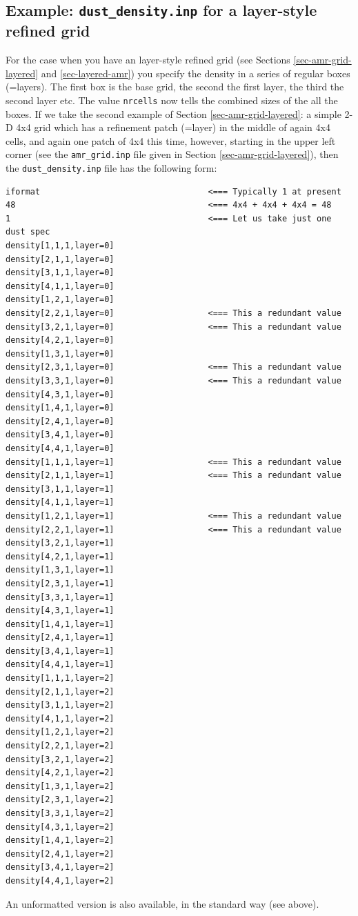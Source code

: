 \documentclass{report}
\newenvironment{asciibox}%
  {\begin{list}{}{%
    \setlength{\topsep}{0.5em}%
    \setlength{\parskip}{0em}%
    \setlength{\parsep}{0em}%
    \setlength{\itemsep}{0em}%
    \setlength{\rightmargin}{0em}%
    \setlength{\leftmargin}{3.0em}%
    \setlength{\labelsep}{1em}%
    \setlength{\labelwidth}{2em}%
  }\normalfont\footnotesize\item}
  {\end{list}}
\begin{document}
\subsection{Example: {\small\tt dust\_density.inp} for a layer-style refined grid}
For the case when you have an layer-style refined grid (see Sections
\ref{sec-amr-grid-layered} and \ref{sec-layered-amr}) you specify the
density in a series of regular boxes (=layers). The first box is the base
grid, the second the first layer, the third the second layer etc.  The value
{\small\tt nrcells} now tells the combined sizes of the all the boxes. If we
take the second example of Section \ref{sec-amr-grid-layered}: a simple 2-D
4x4 grid which has a refinement patch (=layer) in the middle of again 4x4
cells, and again one patch of 4x4 this time, however, starting in the upper
left corner (see the {\small\tt amr\_grid.inp} file given in Section
\ref{sec-amr-grid-layered}), then the {\small\tt dust\_density.inp} file
has the following form:
\begin{asciibox}\begin{verbatim}
iformat                                  <=== Typically 1 at present
48                                       <=== 4x4 + 4x4 + 4x4 = 48
1                                        <=== Let us take just one dust spec
density[1,1,1,layer=0]
density[2,1,1,layer=0]
density[3,1,1,layer=0]
density[4,1,1,layer=0]
density[1,2,1,layer=0]
density[2,2,1,layer=0]                   <=== This a redundant value
density[3,2,1,layer=0]                   <=== This a redundant value
density[4,2,1,layer=0]
density[1,3,1,layer=0]
density[2,3,1,layer=0]                   <=== This a redundant value
density[3,3,1,layer=0]                   <=== This a redundant value
density[4,3,1,layer=0]
density[1,4,1,layer=0]
density[2,4,1,layer=0]
density[3,4,1,layer=0]
density[4,4,1,layer=0]
density[1,1,1,layer=1]                   <=== This a redundant value
density[2,1,1,layer=1]                   <=== This a redundant value
density[3,1,1,layer=1]
density[4,1,1,layer=1]
density[1,2,1,layer=1]                   <=== This a redundant value
density[2,2,1,layer=1]                   <=== This a redundant value
density[3,2,1,layer=1]
density[4,2,1,layer=1]
density[1,3,1,layer=1]
density[2,3,1,layer=1]
density[3,3,1,layer=1]
density[4,3,1,layer=1]
density[1,4,1,layer=1]
density[2,4,1,layer=1]
density[3,4,1,layer=1]
density[4,4,1,layer=1]
density[1,1,1,layer=2]
density[2,1,1,layer=2]
density[3,1,1,layer=2]
density[4,1,1,layer=2]
density[1,2,1,layer=2]
density[2,2,1,layer=2]
density[3,2,1,layer=2]
density[4,2,1,layer=2]
density[1,3,1,layer=2]
density[2,3,1,layer=2]
density[3,3,1,layer=2]
density[4,3,1,layer=2]
density[1,4,1,layer=2]
density[2,4,1,layer=2]
density[3,4,1,layer=2]
density[4,4,1,layer=2]
\end{verbatim}\end{asciibox}
An unformatted version is also available, in the standard way (see above).
\end{document}
